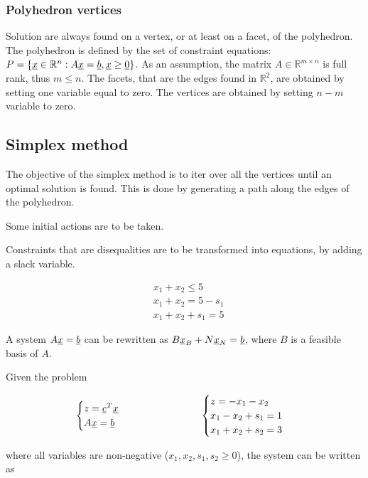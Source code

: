 \subsubsection{Polyhedron vertices}

Solution are always found on a vertex, or at least on a facet, of the polyhedron.
The polyhedron is defined by the set of constraint equations: $P = \{ \underline{x} \in \mathbb{R}^n : A \underline{x} = \underline{b}, \underline{x} \ge \underline{0} \}$.
As an assumption, the matrix $A \in \mathbb{R}^{m \times n}$ is full rank, thus $m \le n$.
The facets, that are the edges found in $\mathbb{R}^2$, are obtained by setting one variable equal to zero.
The vertices are obtained by setting $n-m$ variable to zero.

\subsection{Simplex method}

The objective of the simplex method is to iter over all the vertices until an optimal solution is found.
This is done by generating a path along the edges of the polyhedron.

Some initial actions are to be taken.

Constraints that are disequalities are to be transformed into equations, by adding a slack variable.

\begin{align*}
& x_1 + x_2 \le 5 \\
& x_1 + x_2 = 5 - s_1 \\
& x_1 + x_2 + s_1 = 5
\end{align*}

A system $A \underline{x} = \underline{b}$ can be rewritten as $B \underline{x}_B + N \underline{x}_N = \underline{b}$, where $B$ is a feasible basis of $A$.

Given the problem

$$
\begin{cases}
    z = \underline{c}^T \underline{x} \\
    A \underline{x} = \underline{b}
\end{cases}
\hspace{2.5cm}
\begin{cases}
    z = - x_1 - x_2 \\
    x_1 - x_2 + s_1 = 1 \\
    x_1 + x_2 + s_2 = 3
\end{cases}
$$

where all variables are non-negative ($x_1, x_2, s_1, s_2 \ge 0$), the system can be written as


